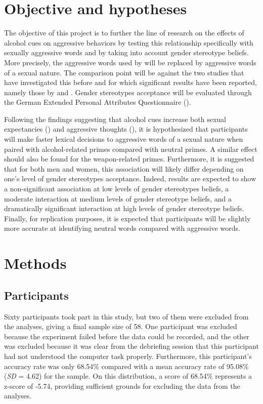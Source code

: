 \documentclass[serif, authordate, twocolumn, empirical]{jote-article}
\begin{document}
\section*{Objective and hypotheses}
The objective of this project is to further the line of research on the effects of alcohol cues on aggressive behaviors by testing this relationship specifically with sexually aggressive words and by taking into account gender stereotype beliefs. More precisely, the aggressive words used by \textcite{BartholowHeinz2006} will be replaced by aggressive words of a sexual nature. The comparison point will be against the two studies that have investigated this before and for which significant results have been reported, namely those by \textcite{BartholowHeinz2006} and \textcite{SubraMullerBegueLBushmanDelmas2010}. Gender stereotypes acceptance will be evaluated through the German Extended Personal Attributes Questionnaire (\cite{RungeFreyGollwitzerHelmreichSpence1981}).

Following the findings suggesting that alcohol cues increase both sexual expectancies (\cite{FriedmanMcCarthyForsterJDenzler2005}) and aggressive thoughts (), it is hypothesized that participants will make faster lexical decisions to aggressive words of a sexual nature when paired with alcohol-related primes compared with neutral primes. A similar effect should also be found for the weapon-related primes. Furthermore, it is suggested that for both men and women, this association will likely differ depending on one’s level of gender stereotypes acceptance. Indeed, results are expected to show a non-significant association at low levels of gender stereotypes beliefs, a moderate interaction at medium levels of gender stereotype beliefs, and a dramatically significant interaction at high levels of gender stereotype beliefs. Finally, for replication purposes, it is expected that participants will be slightly more accurate at identifying neutral words compared with aggressive words. 

{}
\section*{Methods} %
\label{sec:methods}

{}
\subsection*{Participants}
Sixty participants took part in this study, but two of them were excluded from the analyses, giving a final sample size of 58. One participant was excluded because the experiment failed before the data could be recorded, and the other was excluded because it was clear from the debriefing session that this participant had not understood the computer task properly. Furthermore, this participant’s accuracy rate was only 68.54$\%$  compared with a mean accuracy rate of 95.08$\%$  (\textit{SD }= 4.62) for the sample. On this distribution, a score of 68.54$\%$  represents a z-score of -5.74, providing sufficient grounds for excluding the data from the analyses. 
\end{document}
